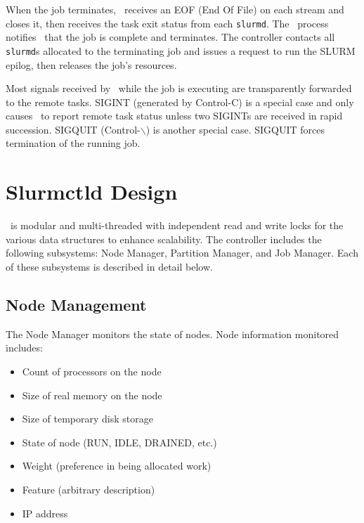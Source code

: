 \documentclass[10pt,onecolumn,times]{../common/llncs}
\begin{document}
{When the job terminates, \srun\ receives an EOF (End Of File) on each
stream and closes it, then receives the task exit status from each
{\tt slurmd}.  The \srun\ process notifies \slurmctld\ that the job is
complete and terminates. The controller contacts all {\tt slurmd}s allocated
to the terminating job and issues a request to run the SLURM epilog,
then releases the job's resources.

Most signals received by \srun\ while the job is executing are 
transparently forwarded to the remote tasks. SIGINT (generated by
Control-C) is a special case and only causes \srun\ to report 
remote task status unless two SIGINTs are received in rapid succession.
SIGQUIT (Control-$\backslash$) is another special case. SIGQUIT forces 
termination of the running job.

\section{Slurmctld Design}

\slurmctld\ is modular and multi-threaded with independent read and
write locks for the various data structures to enhance scalability.
The controller includes the following subsystems: Node Manager, Partition
Manager, and Job Manager.  Each of these subsystems is described in
detail below.

\subsection{Node Management}

The Node Manager monitors the state of nodes.  Node information monitored
includes:

\begin{itemize}
\item Count of processors on the node
\item Size of real memory on the node
\item Size of temporary disk storage
\item State of node (RUN, IDLE, DRAINED, etc.)
\item Weight (preference in being allocated work)
\item Feature (arbitrary description)
\item IP address
\end{itemize}

}
\end{document}
